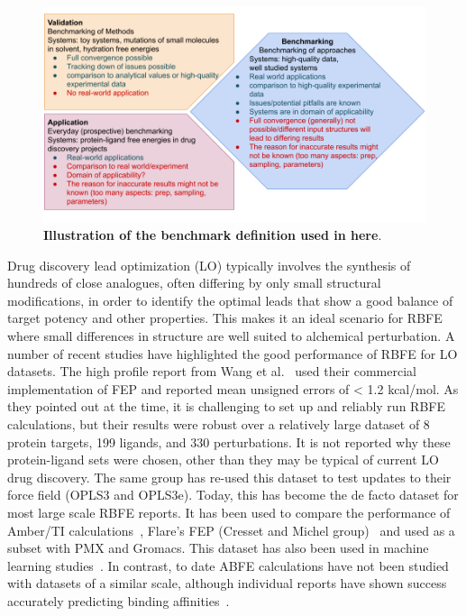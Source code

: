 \documentclass[9pt,bestpractices]{livecoms}
\begin{document}
\begin{figure}
    \includegraphics[width=0.95\linewidth]{figures/introduction/benchmarking_definition.png}
    \caption{\textbf{Illustration of the benchmark definition used in here}.}
    \label{fig:benchmarking_definition}
\end{figure}

Drug discovery lead optimization (LO) typically involves the synthesis of hundreds of close analogues, often differing by only small structural modifications, in order to identify the optimal leads that show a good balance of target potency and other properties. This makes it an ideal scenario for RBFE where small differences in structure are well suited to alchemical perturbation. A number of recent studies have highlighted the good performance of RBFE for LO datasets. The high profile report from Wang et al.~\cite{wangAccurateReliablePrediction2015} used their commercial implementation of FEP and reported mean unsigned errors of < 1.2 kcal/mol. As they pointed out at the time, it is challenging to set up and reliably run RBFE calculations, but their results were robust over a relatively large dataset of 8 protein targets, 199 ligands, and 330 perturbations. It is not reported why these protein-ligand sets were chosen, other than they may be typical of current LO drug discovery. The same group has re-used this dataset to test updates to their force field (OPLS3\cite{harder_opls3_2016} and OPLS3e\cite{roos_opls3e_2019}). Today, this has become the de facto dataset for most large scale RBFE reports. It has been used to compare the performance of Amber/TI calculations~\cite{songUsingAMBER18Relative2019}, Flare’s FEP (Cresset and Michel group)~\cite{kuhnAssessmentBindingAffinity2020} and used as a subset with PMX and Gromacs\cite{gapsysLargeScaleRelative2020}. This dataset has also been used in machine learning studies~\cite{jimenezDEEPProteinLigand2018,jimenez-lunaDeltaDeltaNeuralNetworks2019}. In contrast, to date ABFE calculations have not been studied with datasets of a similar scale, although individual reports have shown success accurately predicting binding affinities~\cite{aldeghiLargescaleAnalysisWater2018,courniaRigorousFreeEnergy2020}.
\end{document}
